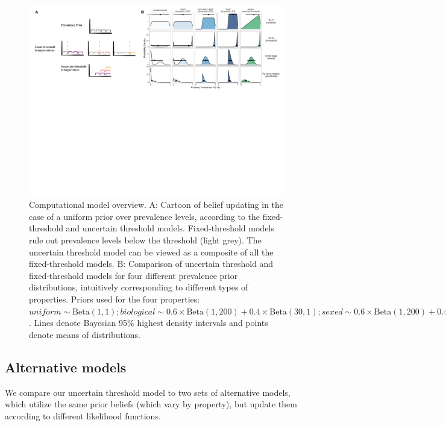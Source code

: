 \documentclass[floatsintext,man]{apa6}
\begin{document}
\begin{figure}
\centering
\includegraphics{figs/cartoon-model-sims}
\caption{\label{fig:modelSimulations}
Computational model overview.
A: Cartoon of belief updating in the case of a uniform prior over prevalence levels, according to the fixed-threshold and uncertain threshold models. Fixed-threshold models rule out prevalence levels below the threshold (light grey). The uncertain threshold model can be viewed as a composite of all the fixed-threshold models.
B: Comparison of uncertain threshold and fixed-threshold models for four different prevalence prior distributions, intuitively corresponding to different types of properties. Priors used for the four properties: $\textit{uniform} \sim \text{Beta}(1, 1); \textit{biological} \sim 0.6 \times \text{Beta}(1, 200) + 0.4 \times \text{Beta}(30, 1); \textit{sexed} \sim 0.6 \times \text{Beta}(1, 200) + 0.4 \times \text{Beta}(10, 10); \textit{accidental} \sim 0.6 \times \text{Beta}(1, 200) + 0.4 \times \text{Beta}(2, 10)$. Lines denote Bayesian 95\% highest density intervals and points denote means of distributions.
}
\end{figure}


\hypertarget{alternative-semantic-models}{%
\subsection{Alternative models}\label{alternative-semantic-models}}

We compare our uncertain threshold model to two sets of alternative models, which utilize the same prior beliefs (which vary by property), but update them according to different likelihood functions. 
\end{document}
